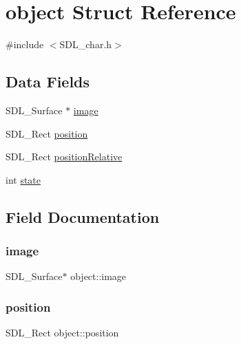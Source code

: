 \hypertarget{structobject}{}\section{object Struct Reference}
\label{structobject}


{\ttfamily \#include $<$S\+D\+L\+\_\+char.\+h$>$}

\subsection*{Data Fields}
\begin{DoxyCompactItemize}
\item 
S\+D\+L\+\_\+\+Surface $\ast$ \mbox{\hyperlink{structobject_ae8f96dd75368fdcaecd7186e0cf6795b}{image}}
\item 
S\+D\+L\+\_\+\+Rect \mbox{\hyperlink{structobject_a3285ee8872b0cc5eac8a3ab962eaca8d}{position}}
\item 
S\+D\+L\+\_\+\+Rect \mbox{\hyperlink{structobject_a47f3254b4bebecf259984b1ac751bc0b}{position\+Relative}}
\item 
int \mbox{\hyperlink{structobject_a85d5b4e144fe0635ef91778ad2a0c3e1}{state}}
\end{DoxyCompactItemize}


\subsection{Field Documentation}
\mbox{\label{structobject_ae8f96dd75368fdcaecd7186e0cf6795b}} 
\subsubsection{\texorpdfstring{image}{image}}
{\footnotesize\ttfamily S\+D\+L\+\_\+\+Surface$\ast$ object\+::image}

\mbox{\label{structobject_a3285ee8872b0cc5eac8a3ab962eaca8d}} 
\subsubsection{\texorpdfstring{position}{position}}
{\footnotesize\ttfamily S\+D\+L\+\_\+\+Rect object\+::position}

\mbox{\label{structobject_a47f3254b4bebecf259984b1ac751bc0b}} 
